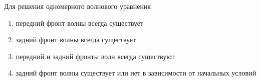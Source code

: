 Для решения одномерного волнового уравнения

\begin{enumerate}[label=\arabic*)]
    \item передний фронт волны всегда существует
    \item задний фронт волны всегда существует
    \item передний и задний фронты волн всегда существуют
    \item задний фронт волны существует или нет в зависимости от начальных условий
\end{enumerate}

